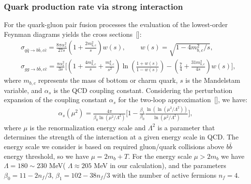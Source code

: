 \subsubsection{Quark production rate via strong interaction}
For the quark-gluon pair fusion processes
the evaluation of the lowest-order Feynman diagrams yields the cross sections~[\cite{Letessier:2002ony}]:
\begin{align}
&\sigma_{q\bar{q}\rightarrow b\bar{b},c\bar{c}}=\frac{8\pi\alpha_s^2}{27s}\left(1+\frac{2m_{b,c}^2}{s}\right)w(s),\,\qquad w(s)=\sqrt{1-{4m^2_{b,c}}/{s}},\\
&\sigma_{gg\rightarrow b\bar{b},c\bar{c}}=\!\frac{\pi\alpha_s^2}{3s}\bigg[\left(1\!+\!\frac{4m^2_{b,c}}{s}\!+\!\frac{m^4_{b,c}}{s^2}\right)\ln{\left(\frac{1+w(s)}{1-w(s)}\right)}\!-\!\left(\frac{7}{4}\!+\!\frac{31m^2_{b,c}}{4s}\right)w(s)\bigg],
\end{align} 
where $m_{b,c}$ represents the mass of bottom or charm quark, $s$ is the Mandelstam variable, and $\alpha_s$ is the QCD coupling constant. Considering the perturbation expansion of the coupling constant $\alpha_s$ for the two-loop approximation~[\cite{Letessier:2002ony}], we have:
\begin{align}
\alpha_s(\mu^2)=\frac{4\pi}{\beta_0\ln({\mu^2/\Lambda^2})}\bigg[1-\frac{\beta_1}{\beta_0}\frac{\ln(\ln{(\mu^2/\Lambda^2)})}{\ln(\mu^2/\Lambda^2)}\bigg],
\end{align}
where $\mu$ is the renormalization energy scale and $\Lambda^2$ is a parameter that determines the strength of the interaction at a given energy scale in QCD. The energy scale we consider is based on required gluon/quark collisions above $b\bar b$ energy threshold, so we have $\mu=2m_b+T$. For the energy scale $\mu>2m_b$ we have $\Lambda=180\sim230$ MeV( $\Lambda\approx205$ MeV in our calculation), and the parameters $\beta_0=11-2n_f/3$, $\beta_1=102-38n_f/3$ with the number of active fermions $n_f=4$. 

